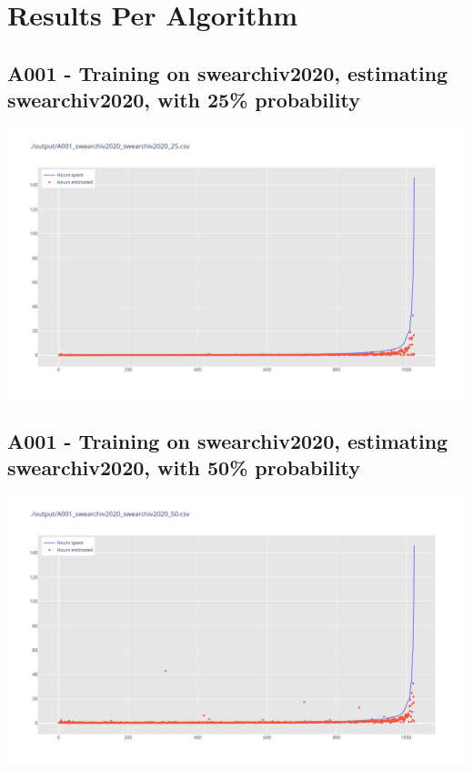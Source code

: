 \newpage{}

\hypertarget{results-per-algorithm}{%
\section{Results Per Algorithm}\label{results-per-algorithm}}

\newpage

\subsection{A001 - Training on swearchiv2020, estimating swearchiv2020, with 25\% probability}

\includegraphics[width=\textwidth]{Scripts/output/A001_swearchiv2020_swearchiv2020_25.csv.png}

\newpage

\subsection{A001 - Training on swearchiv2020, estimating swearchiv2020, with 50\% probability}

\includegraphics[width=\textwidth]{Scripts/output/A001_swearchiv2020_swearchiv2020_50.csv.png}

